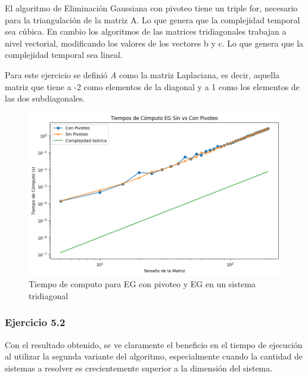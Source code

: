 El algoritmo de Eliminación Gaussiana con pivoteo tiene un triple for, necesario para la triangulación de la matriz A. Lo que genera que la complejidad temporal sea cúbica. En cambio los algoritmos de las matrices tridiagonales trabajan a nivel vectorial, modificando los valores de los vectores b y c. Lo que genera que la complejidad temporal sea lineal.

Para este ejercicio se definió \textit{A} como la matriz Laplaciana, es decir, aquella matriz que tiene a -2 como elementos de la diagonal y a 1 como los elementos de las dos subdiagonales.

\begin{figure}[H]
\centerline{\includegraphics[scale=0.45]{./img/tiempos_EGsinVsConPivoteo.png}}
\caption{Tiempo de computo para EG con pivoteo y EG en un sistema tridiagonal}
\label{result_ej5}
\end{figure}

\subsubsection{Ejercicio 5.2}

Con el resultado obtenido, se ve claramente el beneficio en el tiempo de ejecución al utilizar la segunda variante del algoritmo, especialmente cuando la cantidad de sistemas a resolver es crecientemente superior a la dimensión del sistema.

